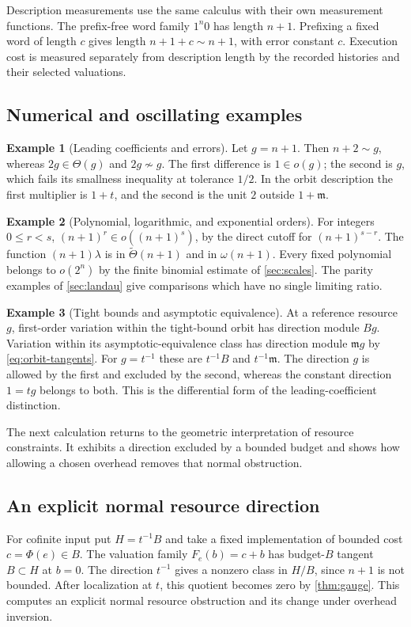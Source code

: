 \documentclass[11pt,a4paper]{article}
\numberwithin{algorithm}{section}
\numberwithin{equation}{section}
\theoremstyle{definition}
\newtheorem{example}[example]{Example}
\theoremstyle{remark}
\theoremstyle{plain}
\theoremstyle{definition}
\theoremstyle{plain}
\begin{document}
Description measurements use the same calculus with their
own measurement functions. The prefix-free word family $1^n0$ has
length $n+1$. Prefixing a fixed word of length $c$ gives
length $n+1+c\sim n+1$, with error constant $c$.
Execution cost is measured separately from description length by
the recorded histories and their selected valuations.

\subsection{Numerical and oscillating examples}
\begin{example}[Leading coefficients and errors]
Let $g=n+1$. Then $n+2\sim g$, whereas $2g\in\Theta(g)$
and $2g\not\sim g$.
The first difference is $1\in o(g)$; the second is $g$,
which fails its smallness inequality at tolerance $1/2$.
In the orbit description the first multiplier is $1+t$,
and the second is the unit $2$ outside $1+\mathfrak m$.
\end{example}

\begin{example}[Polynomial, logarithmic, and exponential orders]
For integers $0\le r<s$, $(n+1)^r\in o((n+1)^s)$,
by the direct cutoff for $(n+1)^{s-r}$.
The function $(n+1)\lambda$ is in
$\widetilde\Theta(n+1)$ and in $\omega(n+1)$.
Every fixed polynomial belongs to $o(2^n)$ by the
finite binomial estimate of \cref{sec:scales}.
The parity examples of \cref{sec:landau} give comparisons
which have no single limiting ratio.
\end{example}

\begin{example}[Tight bounds and asymptotic equivalence]
At a reference resource $g$, first-order variation within
the tight-bound orbit has direction module $Bg$.
Variation within its asymptotic-equivalence class has
direction module $\mathfrak m g$ by
\eqref{eq:orbit-tangents}. For $g=t^{-1}$ these are
$t^{-1}B$ and $t^{-1}\mathfrak m$.
The direction $g$ is allowed by the first and excluded
by the second, whereas the constant direction $1=tg$
belongs to both. This is the differential form of the
leading-coefficient distinction.
\end{example}

The next calculation returns to the geometric interpretation of
resource constraints. It exhibits a direction excluded by a
bounded budget and shows how allowing a chosen overhead removes
that normal obstruction.

\subsection{An explicit normal resource direction}
For cofinite input put $H=t^{-1}B$ and take a fixed
implementation of bounded cost $c=\Phi(e)\in B$.
The valuation family $F_e(b)=c+b$ has budget-$B$ tangent
$B\subset H$ at $b=0$. The direction $t^{-1}$ gives a
nonzero class in $H/B$, since $n+1$ is not bounded.
After localization at $t$, this quotient becomes zero
by \cref{thm:gauge}. This computes an explicit normal
resource obstruction and its change under overhead inversion.
\end{document}
